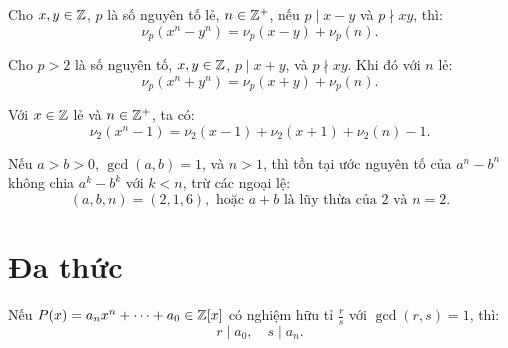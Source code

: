 \documentclass[../imo-training-open-book.tex]{subfiles}
\begin{document}
\vspace{1em}

\begin{theorem}
    \label{theorem:lte-difference}
    Cho \( x, y \in \mathbb Z \), \( p \) là số nguyên tố lẻ, \( n \in \mathbb Z^+ \), nếu \( p \mid x - y \) và \( p \nmid xy \), thì:
    \[
        \nu_p(x^n - y^n) = \nu_p(x - y) + \nu_p(n).
    \]
\end{theorem}

\vspace{1em}

\begin{theorem}
    \label{theorem:lte-sum}
    Cho \( p > 2 \) là số nguyên tố, \( x, y \in \mathbb Z \), \( p \mid x + y \), và \( p \nmid xy \). Khi đó với \( n \) lẻ:
    \[
        \nu_p(x^n + y^n) = \nu_p(x + y) + \nu_p(n).
    \]
\end{theorem}

\vspace{1em}

\begin{theorem}
    \label{theorem:lte-even-difference}
    Với \( x \in \mathbb Z \) lẻ và \( n \in \mathbb Z^+ \), ta có:
    \[
        \nu_2(x^n - 1) = \nu_2(x - 1) + \nu_2(x + 1) + \nu_2(n) - 1.
    \]
\end{theorem}

\vspace{1em}

\begin{theorem}
    \label{theorem:zsigmondy}
    Nếu \( a > b > 0 \), \( \gcd(a, b) = 1 \), và \( n > 1 \), thì tồn tại ước nguyên tố của \( a^n - b^n \) không chia \( a^k - b^k \) với \( k < n \), trừ các ngoại lệ:
    \[
        (a, b, n) = (2, 1, 6), \text{ hoặc } a + b \text{ là lũy thừa của 2 và } n = 2.
    \]
\end{theorem}

\newpage

\section{Đa thức}

\begin{theorem}
    \label{theorem:rational-root-theorem}
    Nếu \( P(x) = a_nx^n + \dots + a_0 \in \mathbb Z[x] \) có nghiệm hữu tỉ \( \frac{r}{s} \) với \( \gcd(r,s) = 1 \), thì:
    \[
        r \mid a_0,\quad s \mid a_n.
    \]
\end{theorem}
\end{document}
